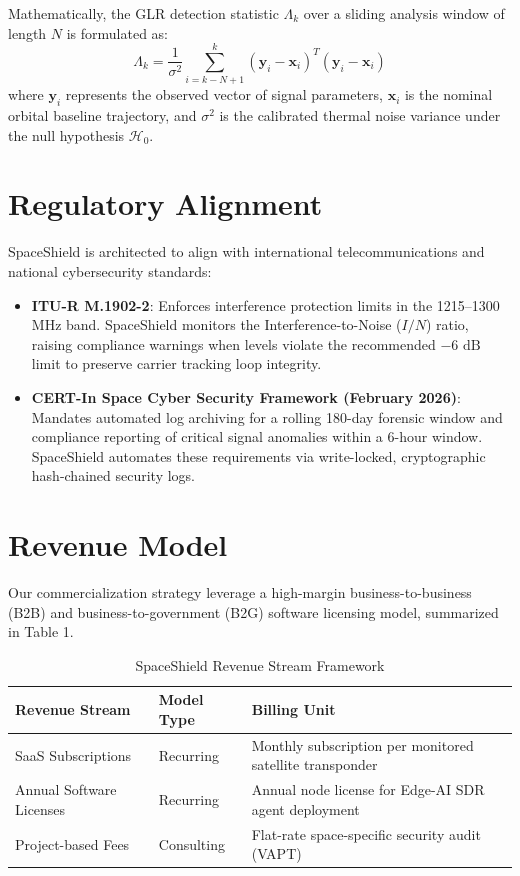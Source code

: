 \documentclass[11pt,a4paper]{article}
\begin{document}
Mathematically, the GLR detection statistic $\Lambda_k$ over a sliding analysis window of length $N$ is formulated as:
\begin{equation}
\Lambda_k = \frac{1}{\sigma^2} \sum_{i=k-N+1}^{k} (\mathbf{y}_i - \mathbf{x}_i)^T (\mathbf{y}_i - \mathbf{x}_i)
\end{equation}
where $\mathbf{y}_i$ represents the observed vector of signal parameters, $\mathbf{x}_i$ is the nominal orbital baseline trajectory, and $\sigma^2$ is the calibrated thermal noise variance under the null hypothesis $\mathcal{H}_0$.

\section*{Regulatory Alignment}
SpaceShield is architected to align with international telecommunications and national cybersecurity standards:
\begin{itemize}
    \item \textbf{ITU-R M.1902-2}: Enforces interference protection limits in the 1215--1300 MHz band. SpaceShield monitors the Interference-to-Noise ($I/N$) ratio, raising compliance warnings when levels violate the recommended $-6\text{ dB}$ limit to preserve carrier tracking loop integrity.
    \item \textbf{CERT-In Space Cyber Security Framework (February 2026)}: Mandates automated log archiving for a rolling 180-day forensic window and compliance reporting of critical signal anomalies within a 6-hour window. SpaceShield automates these requirements via write-locked, cryptographic hash-chained security logs.
\end{itemize}

\section*{Revenue Model}
Our commercialization strategy leverage a high-margin business-to-business (B2B) and business-to-government (B2G) software licensing model, summarized in Table 1.

\begin{table}[h]
\centering
\caption{SpaceShield Revenue Stream Framework}
\label{tab:revenue}
\begin{tabular}{lll}
\toprule
\textbf{Revenue Stream} & \textbf{Model Type} & \textbf{Billing Unit} \\
\midrule
SaaS Subscriptions & Recurring & Monthly subscription per monitored satellite transponder \\
Annual Software Licenses & Recurring & Annual node license for Edge-AI SDR agent deployment \\
Project-based Fees & Consulting & Flat-rate space-specific security audit (VAPT) \\
\bottomrule
\end{tabular}
\end{table}
\end{document}
